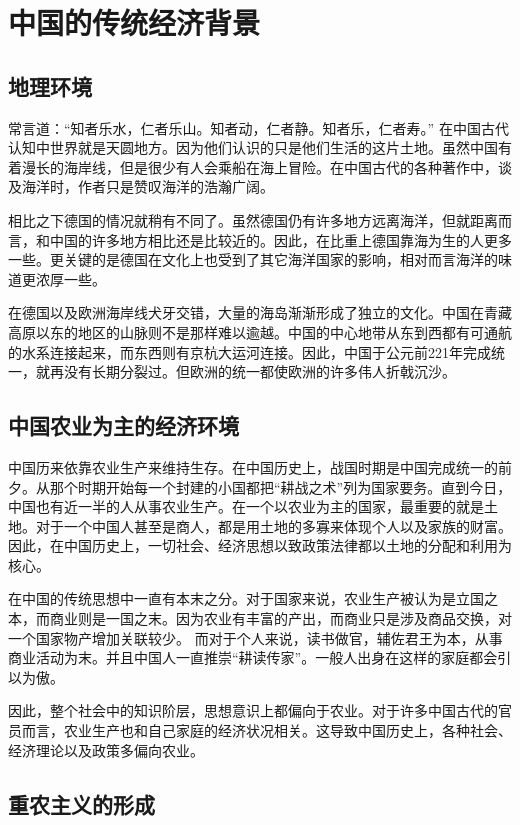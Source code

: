 \section{中国的传统经济背景}

\subsection{地理环境}

常言道：“知者乐水，仁者乐山。知者动，仁者静。知者乐，仁者寿。” 在中国古代认知中世界就是天圆地方。因为他们认识的只是他们生活的这片土地。虽然中国有着漫长的海岸线，但是很少有人会乘船在海上冒险。在中国古代的各种著作中，谈及海洋时，作者只是赞叹海洋的浩瀚广阔。

相比之下德国的情况就稍有不同了。虽然德国仍有许多地方远离海洋，但就距离而言，和中国的许多地方相比还是比较近的。因此，在比重上德国靠海为生的人更多一些。更关键的是德国在文化上也受到了其它海洋国家的影响，相对而言海洋的味道更浓厚一些。

在德国以及欧洲海岸线犬牙交错，大量的海岛渐渐形成了独立的文化。中国在青藏高原以东的地区的山脉则不是那样难以逾越。中国的中心地带从东到西都有可通航的水系连接起来，而东西则有京杭大运河连接。因此，中国于公元前221年完成统一，就再没有长期分裂过。但欧洲的统一都使欧洲的许多伟人折戟沉沙。

\subsection{中国农业为主的经济环境}

中国历来依靠农业生产来维持生存。在中国历史上，战国时期是中国完成统一的前夕。从那个时期开始每一个封建的小国都把“耕战之术”列为国家要务。直到今日，中国也有近一半的人从事农业生产。在一个以农业为主的国家，最重要的就是土地。对于一个中国人甚至是商人，都是用土地的多寡来体现个人以及家族的财富。因此，在中国历史上，一切社会、经济思想以致政策法律都以土地的分配和利用为核心。


在中国的传统思想中一直有本末之分。对于国家来说，农业生产被认为是立国之本，而商业则是一国之末。因为农业有丰富的产出，而商业只是涉及商品交换，对一个国家物产增加关联较少。
而对于个人来说，读书做官，辅佐君王为本，从事商业活动为末。并且中国人一直推崇“耕读传家”。一般人出身在这样的家庭都会引以为傲。

因此，整个社会中的知识阶层，思想意识上都偏向于农业。对于许多中国古代的官员而言，农业生产也和自己家庭的经济状况相关。这导致中国历史上，各种社会、经济理论以及政策多偏向农业。

\subsection{重农主义的形成}

